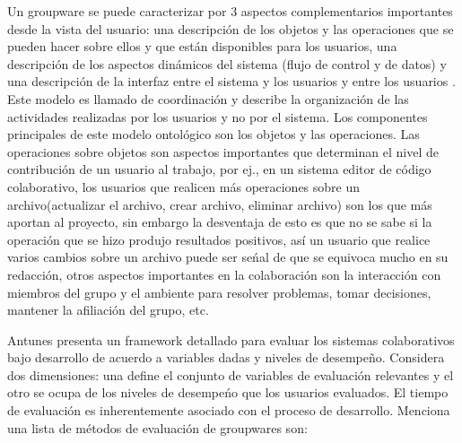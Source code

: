Un groupware se puede caracterizar por 3 aspectos complementarios importantes desde la vista del usuario: una descripci\'on de los objetos y las operaciones que se pueden hacer sobre ellos y que est\'an disponibles para los usuarios, una descripci\'on de los aspectos din\'amicos del sistema (flujo de control y  de datos) y una descripci\'on de la interfaz entre el sistema y los usuarios y entre los usuarios \citep{ellis1994conceptual}. Este modelo es llamado de coordinaci\'on y describe la organizaci\'on de las actividades realizadas por los usuarios y no por el sistema. Los componentes principales de este modelo ontol\'ogico son los objetos y las operaciones. Las operaciones sobre objetos son aspectos importantes que determinan el nivel de contribuci\'on de un usuario al trabajo\citep{ellis1994conceptual}, por ej., en un sistema editor de c\'odigo colaborativo, los usuarios que realicen m\'as operaciones sobre un archivo(actualizar el archivo, crear archivo, eliminar archivo) son los que m\'as aportan al proyecto, sin embargo la desventaja de esto es que no se sabe si la operaci\'on que se hizo produjo resultados positivos, as\'i un usuario que realice varios cambios sobre un archivo puede ser se\'nal de que se equivoca mucho en su redacci\'on, otros aspectos importantes en la colaboraci\'on son la interacci\'on con miembros del grupo y el ambiente para resolver problemas, tomar decisiones, mantener la afiliaci\'on del grupo, etc.

Antunes\citep{antunes2008structuring} presenta un framework detallado para evaluar los sistemas colaborativos bajo desarrollo de acuerdo a variables dadas y niveles de desempe\~no. Considera dos dimensiones: una define el conjunto de variables de evaluaci\'on relevantes y el otro se ocupa de los niveles de desempe\'no que los usuarios evaluados. El tiempo de evaluaci\'on es inherentemente asociado con el proceso de desarrollo. Menciona una lista de m\'etodos de evaluaci\'on de groupwares son: 

